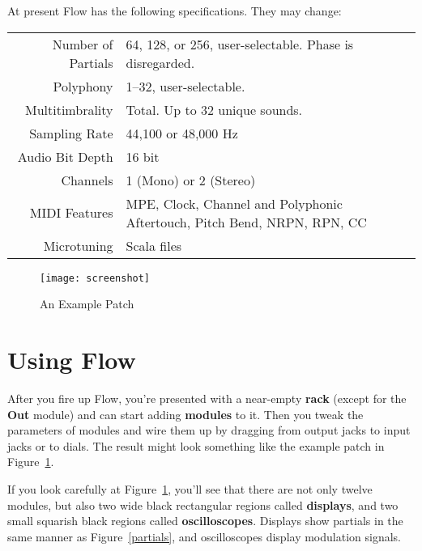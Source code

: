 \documentclass{article}
\newcommand\bump{\vspace{20in}}
\newcommand\name{Flow}
\begin{document}
At present {\name} has the following specifications.  They may change:

\begin{center}
\begin{tabular}{rl}
Number of Partials&64, 128, or 256, user-selectable.  Phase is disregarded.\\
Polyphony&1--32, user-selectable.\\
Multitimbrality&Total.  Up to 32 unique sounds.\\
Sampling Rate&44,100 or 48,000 Hz\\
Audio Bit Depth&16 bit\\
Channels&1 (Mono) or 2 (Stereo)\\
MIDI Features&MPE, Clock, Channel and Polyphonic Aftertouch, Pitch Bend, NRPN, RPN, CC\\
Microtuning&Scala files
\end{tabular}
\end{center}


\bump

\begin{figure}[t]
\begin{center}\texttt{[image: screenshot]}\end{center}
\vspace{-3em}
\caption{An Example Patch}
\label{screenshot}
\end{figure}


\section{Using {\name}}

After you fire up {\name}, you're presented with a near-empty {\bf rack} (except for the {\bf Out} module) and can start adding {\bf modules} to it.  Then you tweak the parameters of modules and wire them up by dragging from output jacks to input jacks or to dials.  The result might look something like the example patch in Figure~\ref{screenshot}.

If you look carefully at Figure~\ref{screenshot}, you'll see that there are not only twelve modules, but also two wide black rectangular regions called {\bf displays}, and two small squarish black regions called {\bf oscilloscopes}.  Displays show partials in the same manner as Figure~\ref{partials}, and oscilloscopes display modulation signals.
\end{document}
